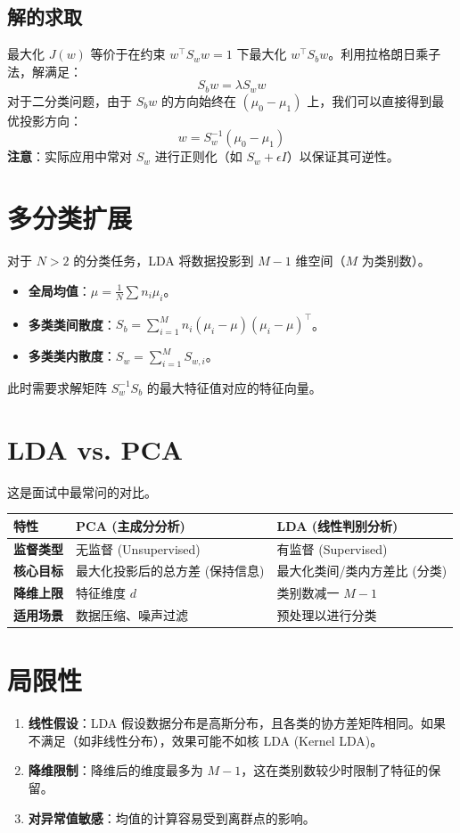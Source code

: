 \documentclass[12pt, a4paper]{article}
\begin{document}
\subsection{解的求取}
最大化 $J(w)$ 等价于在约束 $w^\top S_w w = 1$ 下最大化 $w^\top S_b w$。利用拉格朗日乘子法，解满足：
$$ S_b w = \lambda S_w w $$
对于二分类问题，由于 $S_b w$ 的方向始终在 $(\mu_0 - \mu_1)$ 上，我们可以直接得到最优投影方向：
$$ w = S_w^{-1} (\mu_0 - \mu_1) $$
\textbf{注意}：实际应用中常对 $S_w$ 进行正则化（如 $S_w + \epsilon I$）以保证其可逆性。

\section{多分类扩展}
对于 $N > 2$ 的分类任务，LDA 将数据投影到 $M-1$ 维空间（$M$ 为类别数）。
\begin{itemize}
    \item \textbf{全局均值}：$\mu = \frac{1}{N} \sum n_i \mu_i$。
    \item \textbf{多类类间散度}：$S_b = \sum_{i=1}^M n_i (\mu_i - \mu)(\mu_i - \mu)^\top$。
    \item \textbf{多类类内散度}：$S_w = \sum_{i=1}^M S_{w,i}$。
\end{itemize}
此时需要求解矩阵 $S_w^{-1} S_b$ 的最大特征值对应的特征向量。

\section{LDA vs. PCA}
这是面试中最常问的对比。
\begin{table}[h]
\centering
\begin{tabularx}{\textwidth}{|l|X|X|}
\hline
\textbf{特性} & \textbf{PCA (主成分分析)} & \textbf{LDA (线性判别分析)} \\
\hline
\textbf{监督类型} & 无监督 (Unsupervised) & 有监督 (Supervised) \\
\hline
\textbf{核心目标} & 最大化投影后的总方差 (保持信息) & 最大化类间/类内方差比 (分类) \\
\hline
\textbf{降维上限} & 特征维度 $d$ & 类别数减一 $M-1$ \\
\hline
\textbf{适用场景} & 数据压缩、噪声过滤 & 预处理以进行分类 \\
\hline
\end{tabularx}
\end{table}

\section{局限性}
\begin{enumerate}
    \item \textbf{线性假设}：LDA 假设数据分布是高斯分布，且各类的协方差矩阵相同。如果不满足（如非线性分布），效果可能不如核 LDA (Kernel LDA)。
    \item \textbf{降维限制}：降维后的维度最多为 $M-1$，这在类别数较少时限制了特征的保留。
    \item \textbf{对异常值敏感}：均值的计算容易受到离群点的影响。
\end{enumerate}
\end{document}
